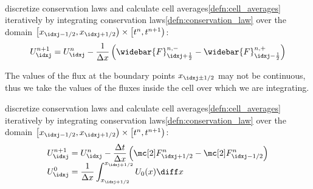 \begin{propositionbox}\nospacing
    \begin{proposition}\leavevmode\\
        \label{proposition:discontinuous_finite_volume_method}
        discretize conservation laws and calculate cell averages\cref{defn:cell_averages} iteratively by integrating conservation laws\cref{defn:conservation_law}
        over the domain $\left[x_{\idxj-1/2},x_{\idxj+1/2}\right)\times \left[t^{n},t^{n+1}\right)$:
          \begin{align}
            U_{\idxj}^{n+1}=U_{\idxj}^{n}-\frac{1}{\Delta x}\left(\widebar{F}_{\idxj+\frac{1}{2}}^{n,-}-\widebar{F}_{\idxj-\frac{1}{2}}^{n,+}\right)
          \end{align}
    \end{proposition}
\end{propositionbox}
\begin{explanationbox}\nospacing
    \begin{explanation}
      The values of the flux at the boundary points $x_{\idxj\pm1/2}$ may not be continuous, thus we take the values of the fluxes inside the cell over which we are integrating.
    \end{explanation}
\end{explanationbox}
\begin{defnbox}\nospacing
    \begin{defn}\label{defn:finite_volume_scheme}
        discretize conservation laws and calculate cell averages\cref{defn:cell_averages} iteratively by integrating conservation laws\cref{defn:conservation_law}
        over the domain $\left[x_{\idxj-1/2},x_{\idxj+1/2}\right)\times \left[t^{n},t^{n+1}\right)$:
        \begin{align}
          U_{\idxj}^{n+1}&=U_{\idxj}^{n}-\frac{\Delta t}{\Delta x}\left(\Flux^{n}_{\idxj+1/2}-\Flux^{n}_{\idxj-1/2}\right)\nonumber\\[-1\jot]
          U_{\idxj}^{0}&=\frac{1}{\Delta x}\int^{x_{\idxj+1/2}}_{x_{\idxj+1/2}}U_{0}(x)\diff x\label{eq:finite_volume_scheme}
        \end{align}
    \end{defn}
\end{defnbox}
